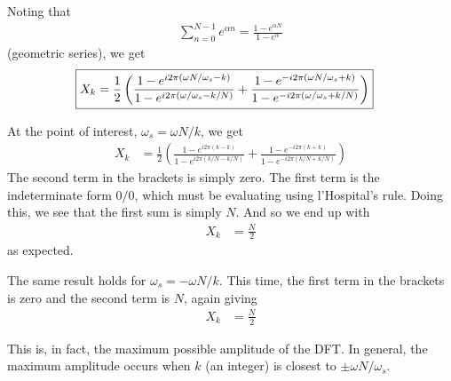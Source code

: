 \documentclass[twocolumn]{myarticle}
\begin{document}
Noting that
\begin{align}
    \sum_{n=0}^{N-1}e^{\alpha n} = \frac{1-e^{\alpha N}}{1-e^{\alpha}}
\end{align}
(geometric series), we get
\begin{align}
    \Aboxed{X_{k} &= \frac{1}{2} \left( \frac{1 - e^{i 2 \pi (\omega N / \omega_s - k)}}{1 - e^{i 2 \pi (\omega / \omega_s - k/N)}} + \frac{1 - e^{-i 2 \pi (\omega N / \omega_s + k)}}{1 - e^{-i 2 \pi (\omega / \omega_s + k/N)}} \right)}
\end{align}

At the point of interest, $ \omega_s = \omega N / k $, we get
\begin{align}
    X_{k} &= \frac{1}{2} \left( \frac{1 - e^{i 2 \pi (k - k)}}{1 - e^{i 2 \pi (k/N - k/N)}} + \frac{1 - e^{-i 2 \pi (k + k)}}{1 - e^{-i 2 \pi (k/N + k/N)}} \right)
\end{align}
The second term in the brackets is simply zero.
The first term is the indeterminate form $ 0/0 $, which must be evaluating using l'Hospital's rule.
Doing this, we see that the first sum is simply $ N $.
And so we end up with
\begin{align}
    X_k &= \frac{N}{2}
\end{align}
as expected.

The same result holds for $ \omega_s = -\omega N / k $.
This time, the first term in the brackets is zero and the second term is $ N $, again giving
\begin{align}
    X_k &= \frac{N}{2}
\end{align}

This is, in fact, the maximum possible amplitude of the DFT.
In general, the maximum amplitude occurs when $ k $ (an integer) is closest to $ \pm \omega N / \omega_s $.
\end{document}
